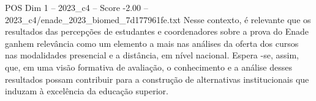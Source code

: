 \begin{textsample}{POS Dim 1 – 2023\_c4 – Score -2.00 – 2023\_c4/enade\_2023\_biomed\_7d177961fe.txt}
Nesse contexto, é relevante que os resultados das percepções de estudantes e coordenadores sobre a prova do Enade ganhem relevância como um elemento a mais nas análises da oferta dos cursos nas modalidades presencial e a distância, em nível nacional.
Espera -se, assim, que, em uma visão formativa de avaliação, o conhecimento e a análise desses resultados possam contribuir para a construção de alternativas institucionais que induzam à excelência da educação superior.

\end{textsample}
